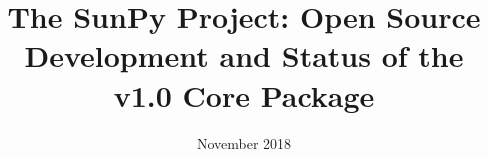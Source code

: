 \documentclass{aastex62}
\begin{document}
\title{The SunPy Project: Open Source Development and Status of the  v1.0 Core Package }


\date{November 2018}











\acknowledgments
{}


\end{document}
